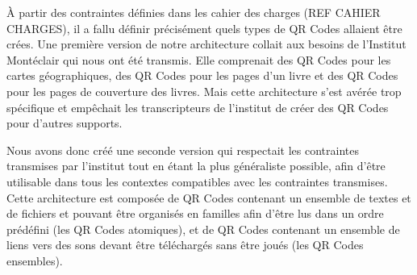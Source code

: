 \par
À partir des contraintes définies dans les cahier des charges (REF CAHIER CHARGES), il a fallu définir précisément quels types de QR Codes allaient être crées. Une première version de notre architecture collait aux besoins de l'Institut Montéclair qui nous ont été transmis. Elle comprenait des QR Codes pour les cartes géographiques, des QR Codes pour les pages d'un livre et des QR Codes pour les pages de couverture des livres. Mais cette architecture s'est avérée trop spécifique et empêchait les transcripteurs de l'institut de créer des QR Codes pour d'autres supports.\\

\par
Nous avons donc créé une seconde version qui respectait les contraintes transmises par l'institut tout en étant la plus généraliste possible, afin d'être utilisable dans tous les contextes compatibles avec les contraintes transmises. Cette architecture est composée de QR Codes contenant un ensemble de textes et de fichiers et pouvant être organisés en familles afin d'être lus dans un ordre prédéfini (les QR Codes atomiques), et de QR Codes contenant un ensemble de liens vers des sons devant être téléchargés sans être joués (les QR Codes ensembles).